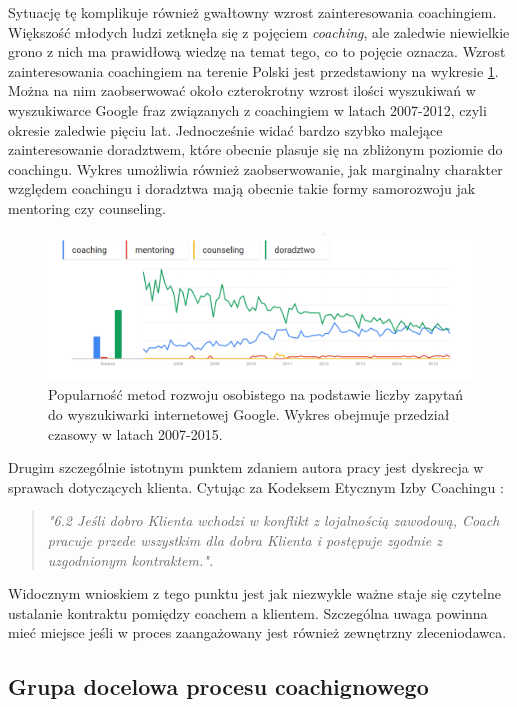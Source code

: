 Sytuację tę komplikuje również gwałtowny wzrost zainteresowania coachingiem. Większość młodych ludzi zetknęła się z
pojęciem \emph{coaching}, ale zaledwie niewielkie grono z nich ma prawidłową wiedzę na temat tego, co to pojęcie oznacza.
Wzrost zainteresowania coachingiem na terenie Polski jest przedstawiony na wykresie \ref{wykres}. Można na nim zaobserwować
około czterokrotny wzrost ilości wyszukiwań w wyszukiwarce Google fraz związanych z coachingiem w latach 2007-2012,
czyli okresie zaledwie pięciu lat. Jednocześnie widać bardzo szybko malejące zainteresowanie doradztwem, które obecnie plasuje się
na zbliżonym poziomie do coachingu. Wykres umożliwia również zaobserwowanie, jak marginalny charakter względem coachingu i
doradztwa mają obecnie takie formy samorozwoju jak mentoring czy counseling.

\begin{figure}[!ht]
  \centering
  \includegraphics[width=17cm]{img/popularnosc}
  \caption{Popularność metod rozwoju osobistego na podstawie liczby zapytań do wyszukiwarki internetowej Google. Wykres obejmuje przedział czasowy w latach 2007-2015.}
  \label{wykres}
\end{figure}

Drugim szczególnie istotnym punktem zdaniem autora pracy jest dyskrecja w sprawach dotyczących klienta. Cytując za Kodeksem Etycznym Izby Coachingu \cite{kodeksib}:
\begin{quote}
\centering
\emph{"6.2 Jeśli dobro Klienta wchodzi w konflikt z lojalnością zawodową, Coach pracuje przede wszystkim dla dobra Klienta i postępuje zgodnie z uzgodnionym kontraktem.".}
\end{quote}
Widocznym wnioskiem z tego punktu jest jak niezwykle ważne staje się czytelne ustalanie kontraktu pomiędzy coachem a klientem.
Szczególna uwaga powinna mieć miejsce jeśli w proces zaangażowany jest również zewnętrzny zleceniodawca.

\subsection{Grupa docelowa procesu coachignowego}

